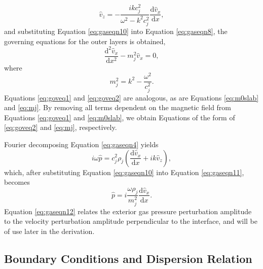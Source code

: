 \documentclass[12pt]{ociamthesis}
\begin{document}
%
\begin{equation}
\label{eq:gaseqn10}
\hat v_z = - \frac{i k c_j^2}{\omega^2 - k^2 c_j^2} \frac{\mathrm{d} \hat v_x}{\mathrm{d} x},
\end{equation}
%
and substituting Equation \eqref{eq:gaseqn10} into Equation \eqref{eq:gaseqn8},  the governing equations for the outer layers is obtained,
%
\begin{equation}
\label{eq:goveq2}
\frac{\mathrm{d}^2 \hat v_x}{\mathrm{d} x^2} - m_j^2 \hat{v}_x = 0,
\end{equation}
%
where
%
\begin{equation}
\label{eq:mj}
m_j^2 = k^2 - \frac{\omega^2}{c_j^2}.
\end{equation}
%
Equations \eqref{eq:goveq1} and \eqref{eq:goveq2} are analogous, as are Equations \eqref{eq:m0slab} and \eqref{eq:mj}.
By removing all terms dependent on the magnetic field from Equations \eqref{eq:goveq1} and \eqref{eq:m0slab}, we obtain Equations of the form of \eqref{eq:goveq2} and \eqref{eq:mj}, respectively.

Fourier decomposing Equation \eqref{eq:gaseqn4} yields
%
\begin{equation}
\label{eq:gaseqn11}
i \omega \hat p
= c_j^2 \rho_j \left( \frac{\mathrm{d} \hat v_x}{\mathrm{d} x}
+ i k \hat v_z \right),
\end{equation}
%
which, after substituting Equation \eqref{eq:gaseqn10} into Equation \eqref{eq:gaseqn11}, becomes
%
\begin{equation}
\label{eq:gaseqn12}
\hat p
= i \frac{\omega \rho_j}{m_j^2} \frac{\mathrm{d} \hat v_x}{\mathrm{d} x}.
\end{equation}
%
Equation \eqref{eq:gaseqn12} relates the exterior gas pressure perturbation amplitude to the velocity perturbation amplitude perpendicular to the interface, and will be of use later in the derivation.



\subsection{Boundary Conditions and Dispersion Relation}
\label{subsec:disprel}
\end{document}
